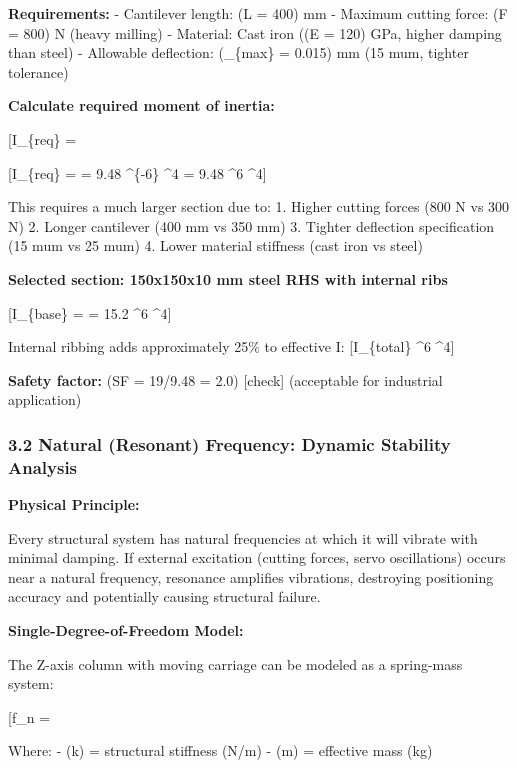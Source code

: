 \documentclass[
]{article}
\begin{document}
\textbf{Requirements:} - Cantilever length: (L = 400) mm - Maximum
cutting force: (F = 800) N (heavy milling) - Material: Cast iron ((E =
120) GPa, higher damping than steel) - Allowable deflection:
(\delta\_\{max\} = 0.015) mm (15 mum, tighter tolerance)

\textbf{Calculate required moment of inertia:}

{[}I\_\{req\} =
\frac{800 \times 0.4^3}{3 \times 120 \times 10^9 \times 0.000015}{]}

{[}I\_\{req\} =  = 9.48 \^{}\{-6\}
\^{}4 = 9.48 \^{}6 \^{}4{]}

This requires a much larger section due to: 1. Higher cutting forces
(800 N vs 300 N) 2. Longer cantilever (400 mm vs 350 mm) 3. Tighter
deflection specification (15 mum vs 25 mum) 4. Lower material stiffness
(cast iron vs steel)

\textbf{Selected section: 150x150x10 mm steel RHS with internal ribs}

{[}I\_\{base\} =  = 15.2 \^{}6
\^{}4{]}

Internal ribbing adds approximately 25\% to effective I: {[}I\_\{total\}
 \^{}6 \^{}4{]}

\textbf{Safety factor:} (SF = 19/9.48 = 2.0) {[}check{]} (acceptable for
industrial application)

\subsubsection{3.2 Natural (Resonant) Frequency: Dynamic Stability
Analysis}\label{natural-resonant-frequency-dynamic-stability-analysis}

\textbf{Physical Principle:}

Every structural system has natural frequencies at which it will vibrate
with minimal damping. If external excitation (cutting forces, servo
oscillations) occurs near a natural frequency, resonance amplifies
vibrations, destroying positioning accuracy and potentially causing
structural failure.

\textbf{Single-Degree-of-Freedom Model:}

The Z-axis column with moving carriage can be modeled as a spring-mass
system:

{[}f\_n =  \sqrt{\frac{k}{m}}{]}

Where: - (k) = structural stiffness (N/m) - (m) = effective mass (kg)
\end{document}
